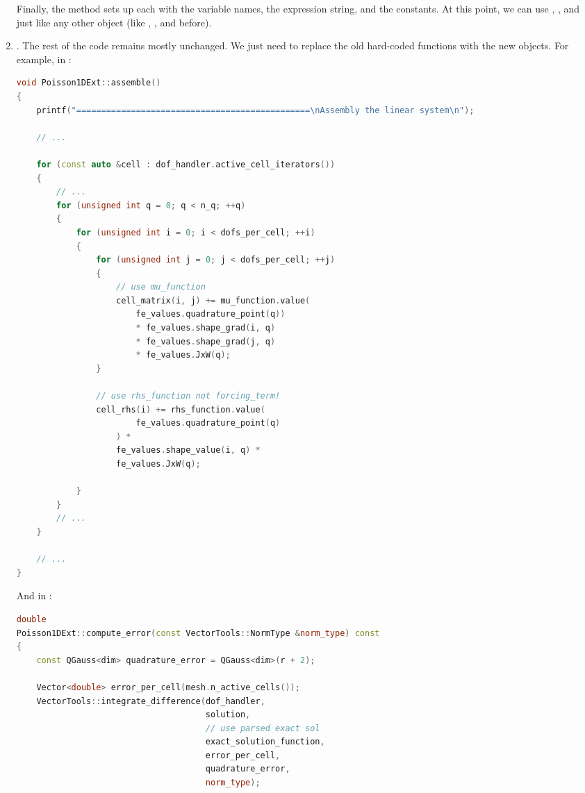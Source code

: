 \begin{enumerate}
    Finally, the  method sets up each  with the variable names, the expression string, and the constants. At this point, we can use , , and  just like any other  object (like , , and  before).


    \item {}. The rest of the code remains mostly unchanged. We just need to replace the old hard-coded functions with the new  objects. For example, in :
    \begin{lstlisting}[language=C++]
void Poisson1DExt::assemble()
{
    printf("===============================================\nAssembly the linear system\n");

    // ...

    for (const auto &cell : dof_handler.active_cell_iterators())
    {
        // ...
        for (unsigned int q = 0; q < n_q; ++q)
        {
            for (unsigned int i = 0; i < dofs_per_cell; ++i)
            {
                for (unsigned int j = 0; j < dofs_per_cell; ++j)
                {
                    // use mu_function
                    cell_matrix(i, j) += mu_function.value(
                        fe_values.quadrature_point(q))
                        * fe_values.shape_grad(i, q)
                        * fe_values.shape_grad(j, q)
                        * fe_values.JxW(q);
                }

                // use rhs_function not forcing_term!
                cell_rhs(i) += rhs_function.value(
                        fe_values.quadrature_point(q)
                    ) *
                    fe_values.shape_value(i, q) *
                    fe_values.JxW(q);

            }
        }
        // ...
    }

    // ...
}\end{lstlisting}
    And in :
    \begin{lstlisting}[language=C++]
double
Poisson1DExt::compute_error(const VectorTools::NormType &norm_type) const
{
    const QGauss<dim> quadrature_error = QGauss<dim>(r + 2);

    Vector<double> error_per_cell(mesh.n_active_cells());
    VectorTools::integrate_difference(dof_handler,
                                      solution,
                                      // use parsed exact sol
                                      exact_solution_function,
                                      error_per_cell,
                                      quadrature_error,
                                      norm_type);


\end{lstlisting}
\end{enumerate}
